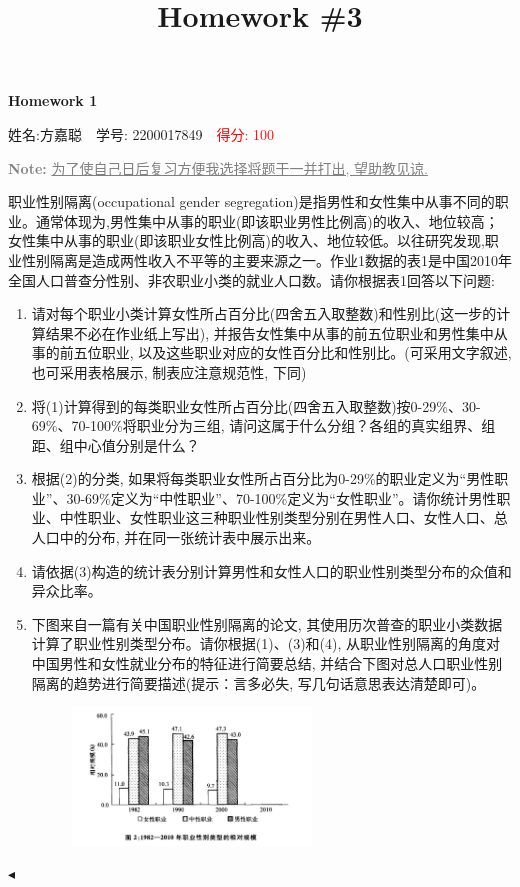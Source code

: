 \documentclass[11pt]{article}
\title{Homework \#3}
\newenvironment{problem}[2][Problem]{\begin{trivlist}
\item[\hskip \labelsep {\bfseries #1}\hskip \labelsep {\bfseries #2.}]\songti}{\hfill$\blacktriangleleft$\end{trivlist}}
\newcommand\1{\mathds{1}}
\begin{document}
\kaishu

\pagestyle{fancy}
\chead{}
\fancyfoot[C]{\thepage\ /\ \pageref{LastPage} \\ \textcolor{lightgray}{最后编译时间: \today}}



\begin{center}
    {\LARGE \bf Homework 1}

    {姓名:方嘉聪\ \  学号: 2200017849\ \ \textcolor{red}{得分: 100}}            %
\end{center}
\textcolor{gray}{\textbf{Note: }\underline{为了使自己日后复习方便我选择将题干一并打出, 望助教见谅.}}
\begin{problem}{1}
    职业性别隔离(occupational gender segregation)是指男性和女性集中从事不同的职业。通常体现为,男性集中从事的职业(即该职业男性比例高)的收入、地位较高；女性集中从事的职业(即该职业女性比例高)的收入、地位较低。以往研究发现,职业性别隔离是造成两性收入不平等的主要来源之一。作业1数据的表1是中国2010年全国人口普查分性别、非农职业小类的就业人口数。请你根据表1回答以下问题:
    \begin{enumerate}[label=(\arabic*)]
        \item 请对每个职业小类计算女性所占百分比(四舍五入取整数)和性别比{\kaishu(这一步的计算结果不必在作业纸上写出)}, 并报告女性集中从事的前五位职业和男性集中从事的前五位职业, 以及这些职业对应的女性百分比和性别比。{\kaishu(可采用文字叙述, 也可采用表格展示, 制表应注意规范性, 下同)}
        \item 将(1)计算得到的每类职业女性所占百分比(四舍五入取整数)按0-29\%、30-69\%、70-100\%将职业分为三组, 请问这属于什么分组？各组的真实组界、组距、组中心值分别是什么？ 
        \item 根据(2)的分类, 如果将每类职业女性所占百分比为0-29\%的职业定义为“男性职业”、30-69\%定义为“中性职业”、70-100\%定义为“女性职业”。请你统计男性职业、中性职业、女性职业这三种职业性别类型分别在男性人口、女性人口、总人口中的分布, 并在同一张统计表中展示出来。
        \item 请依据(3)构造的统计表分别计算男性和女性人口的职业性别类型分布的众值和异众比率。
        \item 下图来自一篇有关中国职业性别隔离的论文, 其使用历次普查的职业小类数据计算了职业性别类型分布。请你根据(1)、(3)和(4), 从职业性别隔离的角度对中国男性和女性就业分布的特征进行简要总结, 并结合下图对总人口职业性别隔离的趋势进行简要描述{\kaishu(提示：言多必失, 写几句话意思表达清楚即可)}。
        \begin{figure}[H]
            \centering
            \includegraphics[width=0.6\textwidth]{./images/1.jpg}
        \end{figure}
    \end{enumerate}
\end{problem}
\end{document}
